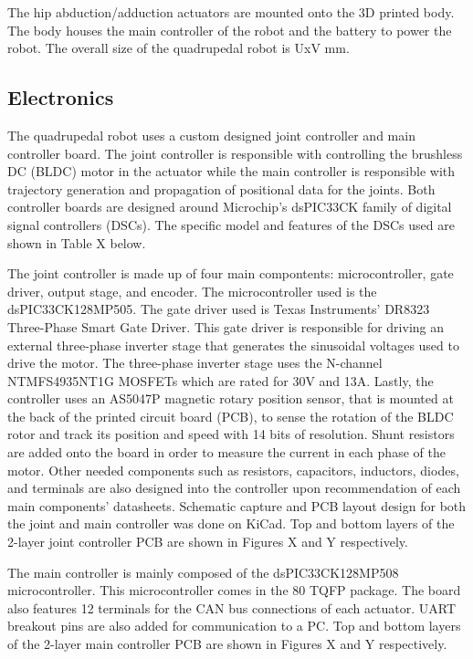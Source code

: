 \documentclass[english]{upeeei}
\begin{document}
The hip abduction/adduction actuators are mounted onto the 3D printed body. The body houses the main controller of the robot and the battery to power the robot. The overall size of the quadrupedal robot is UxV mm.

\subsection{Electronics}

The quadrupedal robot uses a custom designed joint controller and main controller board. The joint controller is responsible with controlling the brushless DC (BLDC) motor in the actuator while the main controller is responsible with trajectory generation and propagation of positional data for the joints. Both controller boards are designed around Microchip's dsPIC33CK family of digital signal controllers (DSCs). The specific model and features of the DSCs used are shown in Table X below.

The joint controller is made up of four main compontents: microcontroller, gate driver, output stage, and encoder. The microcontroller used is the dsPIC33CK128MP505. The gate driver used is Texas Instruments' DR8323 Three-Phase Smart Gate Driver. This gate driver is responsible for driving an external three-phase inverter stage that generates the sinusoidal voltages used to drive the motor. The three-phase inverter stage uses the N-channel NTMFS4935NT1G MOSFETs which are rated for 30V and 13A. Lastly, the controller uses an AS5047P magnetic rotary position sensor, that is mounted at the back of the printed circuit board (PCB), to sense the rotation of the BLDC rotor and track its position and speed with 14 bits of resolution. Shunt resistors are  added onto the board in order to measure the current in each phase of the motor. Other needed components such as resistors, capacitors, inductors, diodes, and terminals are also designed into the controller upon recommendation of each main components' datasheets. Schematic capture and PCB layout design for both the joint and main controller was done on KiCad. Top and bottom layers of the 2-layer joint controller PCB are shown in Figures X and Y respectively.

The main controller is mainly composed of the dsPIC33CK128MP508 microcontroller. This microcontroller comes in the 80 TQFP package. The board also features 12 terminals for the CAN bus connections of each actuator. UART breakout pins are also added for communication to a PC. Top and bottom layers of the 2-layer main controller PCB are shown in Figures X and Y respectively.
\end{document}
